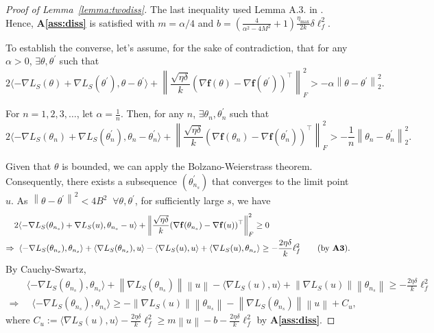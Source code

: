 \documentclass{article}
\newcommand{\norm}[1]{\left\lVert#1\right\rVert} %
\begin{document}
\begin{proof}[Proof of Lemma~\ref{lemma:twodiss}]
    The last inequality used Lemma A.3. in \citet{Farghly}. Hence, \textbf{A\ref{ass:diss}} is satisfied with $m = \alpha / 4$ and $b = \left(\frac{4}{\alpha^2 - 4M^2} +1 \right) \frac{\eta_{\max}}{2k} \delta \ell_f^2.$

    To establish the converse, let's assume, for the sake of contradiction, that for any $\alpha>0$, $\exists \theta, \theta^\prime$ such that $$ 2\langle -\nabla L_S(\theta) + \nabla L_S(\theta^\prime), \theta - \theta^\prime \rangle + \norm{\frac{\sqrt{\eta \delta}}{k} (\nabla \mathbf{f}(\theta) - \nabla \mathbf{f}(\theta^\prime))^\top}_F^2 > -\alpha \norm{\theta - \theta^\prime}_2^2.$$

    For $n=1,2,3, \ldots$, let $\alpha = \frac{1}{n}$. Then, for any $n$, $\exists \theta_n, \theta_n^\prime$ such that $$ 2\langle -\nabla L_S(\theta_n) + \nabla L_S(\theta_n^\prime), \theta_n - \theta_n^\prime \rangle + \norm{\frac{\sqrt{\eta \delta}}{k} (\nabla \mathbf{f}(\theta_n) - \nabla \mathbf{f}(\theta_n^\prime))^\top}_F^2 > -\frac{1}{n} \norm{\theta_n - \theta_n^\prime}_2^2.$$

    Given that $\theta$ is bounded, we can apply the Bolzano-Weierstrass theorem. Consequently, there exists a subsequence $(\theta_{n_s}^\prime)$ that converges to the limit point $u$. As $\norm{\theta - \theta^\prime}^2 < 4B^2  \;\; \forall \theta, \theta^\prime$, for sufficiently large $s$, we have
    \begin{align*}
        & 2\langle -\nabla L_S(\theta_{n_s}) + \nabla L_S(u), \theta_{n_s} - u \rangle + \norm{\frac{\sqrt{\eta \delta}}{k} (\nabla \mathbf{f}(\theta_{n_s}) - \nabla \mathbf{f}(u))^\top}_F^2 \geq 0\\
        \Rightarrow&\;\; \langle -\nabla L_S(\theta_{n_s}), \theta_{n_s} \rangle + \langle \nabla L_S(\theta_{n_s}) , u \rangle - \langle \nabla L_S(u), u \rangle + \langle  \nabla L_S(u), \theta_{n_s}\rangle \geq -\frac{2 \eta \delta}{k} \ell_f^2 \tag{by \textbf{A3}}.
    \end{align*}
    By Cauchy-Swartz,
    \begin{align*}
        & \langle -\nabla L_S(\theta_{n_s}), \theta_{n_s} \rangle + \norm{\nabla L_S(\theta_{n_s})}\norm{u} - \langle \nabla L_S(u), u \rangle + \norm{\nabla L_S(u)}\norm{\theta_{n_s}} \geq -\frac{2 \eta \delta}{k} \ell_f^2 \\
        \Rightarrow&\;\; \langle -\nabla L_S(\theta_{n_s}), \theta_{n_s} \rangle \geq - \norm{\nabla L_S(u)} \norm{\theta_{n_s}} - \norm{\nabla L_S(\theta_{n_s})} \norm{u} + C_u,
    \end{align*}
    where $C_u:= \langle \nabla L_S(u), u \rangle    -\frac{2 \eta \delta}{k} \ell_f^2 \geq m\norm{u} - b - \frac{2 \eta \delta}{k} \ell_f^2$ by \textbf{A\ref{ass:diss}}.


\end{proof}
\end{document}
